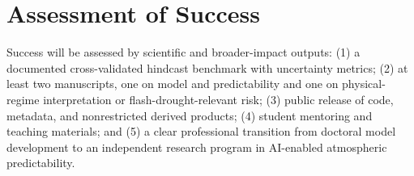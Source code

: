 \documentclass[11pt,letterpaper]{article}
\begin{document}
\section*{Assessment of Success}
Success will be assessed by scientific and broader-impact outputs: (1) a documented cross-validated hindcast benchmark with uncertainty metrics; (2) at least two manuscripts, one on model and predictability and one on physical-regime interpretation or flash-drought-relevant risk; (3) public release of code, metadata, and nonrestricted derived products; (4) student mentoring and teaching materials; and (5) a clear professional transition from doctoral model development to an independent research program in AI-enabled atmospheric predictability.
\end{document}
